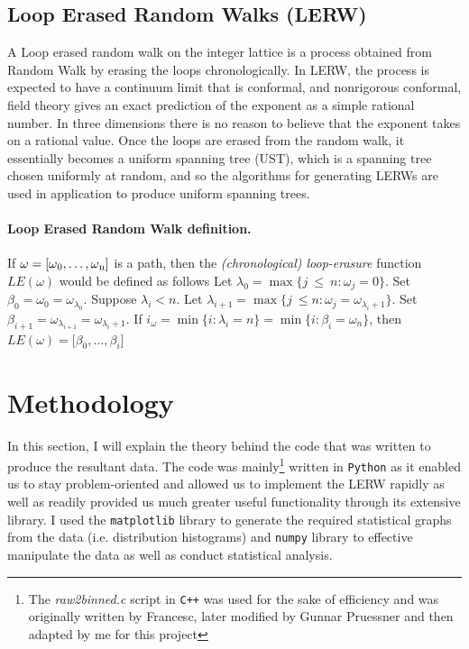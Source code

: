 \documentclass{article}
\begin{document}
\subsection{Loop Erased Random Walks (LERW)}
	A Loop erased random walk on the integer lattice is a process obtained from Random Walk by erasing the loops chronologically. In LERW, the process is expected to have a continuum limit that is conformal, and nonrigorous conformal, field theory gives an exact prediction of the exponent as a simple rational number. In three dimensions there is no reason to believe that the exponent takes on a rational value. Once the loops are erased from the random walk, it essentially becomes a uniform spanning tree (UST), which is a spanning tree chosen uniformly at random, and so the algorithms for generating LERWs are used in application to produce  uniform spanning trees.

\paragraph{Loop Erased Random Walk definition.} \label{alg:LE} If $\omega = [\omega\textsubscript{0}, \ldots, \omega\textsubscript{n}]$ is a path, then the \emph{(chronological) loop-erasure} function $LE(\omega)$ would be defined as follows\cite{klafter2011} \newline
	Let $\lambda_{0} = \max\{j\ \le \ n: \omega_{j}=0\}$. Set $\beta_{0}=\omega_{0}=\omega_{\lambda_{0}}$.
	\newline
	Suppose $\lambda_{i} < n$. Let $\lambda_{i+1} = \max\{j\ \le n: \omega_{j}=\omega_{\lambda_{i}+1}\}$. Set $\beta_{i+1}=\omega_{\lambda_{i+1}}=\omega_{\lambda_{i}+1}$.
	\newline
	If $i_{\omega} = \min \{i : \lambda_{i} = n\} = \min\{i : \beta_{i} = \omega_{n}\}$, then $LE\left(\omega\right) = \lbrack \beta_{0},\ldots,\beta_{i}\rbrack$
\newpage


\section{Methodology}
	In this section, I will explain the theory behind the code that was written to produce the resultant data. The code was mainly\footnote{The \emph{raw2binned.c} script in \texttt{C++} was used for the sake of efficiency and was originally written by Francesc, later modified by Gunnar Pruessner and then adapted by me for this project} written in \texttt{Python} as it enabled us to stay problem-oriented and allowed us to implement the LERW rapidly as well as readily provided us much greater useful functionality through its extensive library. I used the \texttt{matplotlib} library to generate the required statistical graphs from the data (i.e. distribution histograms) and \texttt{numpy} library to effective manipulate the data as well as conduct statistical analysis.
\end{document}
